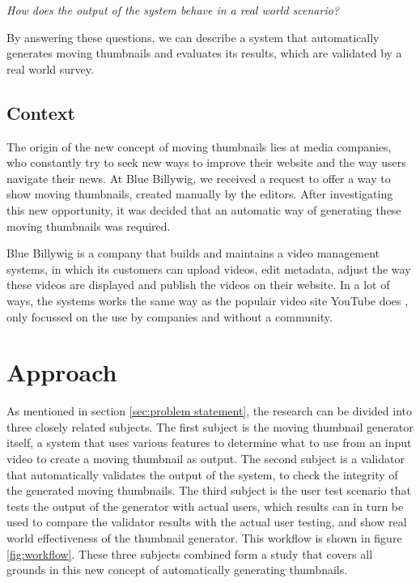 \documentclass{../resources/acm_proc_article-sp}
\begin{document}
\textit{How does the output of the system behave in a real world scenario?}

By answering these questions, we can describe a system that automatically generates moving thumbnails and evaluates its results, which are validated by a real world survey.

\subsection{Context}

The origin of the new concept of moving thumbnails lies at media companies, who constantly try to seek new ways to improve their website and the way users navigate their news. At Blue Billywig, we received a request to offer a way to show moving thumbnails, created manually by the editors. After investigating this new opportunity, it was decided that an automatic way of generating these moving thumbnails was required.

Blue Billywig is a company that builds and maintains a video management systems, in which its customers can upload videos, edit metadata, adjust the way these videos are displayed and publish the videos on their website. In a lot of ways, the systems works the same way as the populair video site YouTube does \cite{YouTube:A-l2msAp}, only focussed on the use by companies and without a community.

\section{Approach}

As mentioned in section \ref{sec:problem statement}, the research can be divided into three closely related subjects. The first subject is the moving thumbnail generator itself, a system that uses various features to determine what to use from an input video to create a moving thumbnail as output. The second subject is a validator that automatically validates the output of the system, to check the integrity of the generated moving thumbnails. The third subject is the user test scenario that tests the output of the generator with actual users, which results can in turn be used to compare the validator results with the actual user testing, and show real world effectiveness of the thumbnail generator. This workflow is shown in figure \ref{fig:workflow}. These three subjects combined form a study that covers all grounds in this new concept of automatically generating thumbnails.
\end{document}
